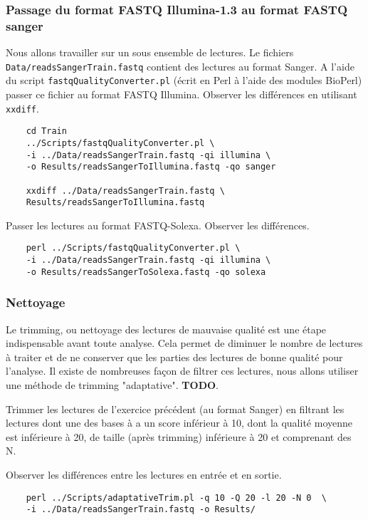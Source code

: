 \documentclass[a4paper,12pt]{article}
\begin{document}
\subsubsection{Passage du format FASTQ Illumina-1.3 au format FASTQ sanger}
Nous allons travailler sur un sous ensemble de lectures. Le fichiers \verb=Data/readsSangerTrain.fastq= contient des lectures au format Sanger. A l'aide du script \verb=fastqQualityConverter.pl= (écrit en Perl à l'aide des modules BioPerl) passer ce fichier au format FASTQ Illumina. Observer les différences
en utilisant \verb=xxdiff=.
\begin{lstlisting}
	cd Train
	../Scripts/fastqQualityConverter.pl \
	-i ../Data/readsSangerTrain.fastq -qi illumina \
	-o Results/readsSangerToIllumina.fastq -qo sanger
	
	xxdiff ../Data/readsSangerTrain.fastq \
	Results/readsSangerToIllumina.fastq
\end{lstlisting}


Passer les lectures au format FASTQ-Solexa. Observer les différences.

\begin{lstlisting}
	perl ../Scripts/fastqQualityConverter.pl \
	-i ../Data/readsSangerTrain.fastq -qi illumina \
	-o Results/readsSangerToSolexa.fastq -qo solexa
	\end{lstlisting}
	
	
\subsubsection{Nettoyage}
Le trimming, ou nettoyage des lectures de mauvaise qualité est une étape indispensable avant toute analyse. Cela permet de diminuer le nombre de lectures à traiter et de ne conserver que les parties des lectures de bonne qualité pour l'analyse. Il existe de nombreuses façon de filtrer ces lectures, nous allons utiliser une méthode de  trimming "adaptative". \textbf{TODO}.

Trimmer les lectures de l'exercice précédent (au format Sanger) en filtrant les lectures dont une des bases à a un score inférieur à 10, dont la qualité moyenne est inférieure à 20, de taille (après trimming) inférieure à 20 et comprenant des N. 

Observer les différences entre les lectures en entrée et en sortie.

\begin{lstlisting}	
	perl ../Scripts/adaptativeTrim.pl -q 10 -Q 20 -l 20 -N 0  \
	-i ../Data/readsSangerTrain.fastq -o Results/
\end{lstlisting}
\end{document}
